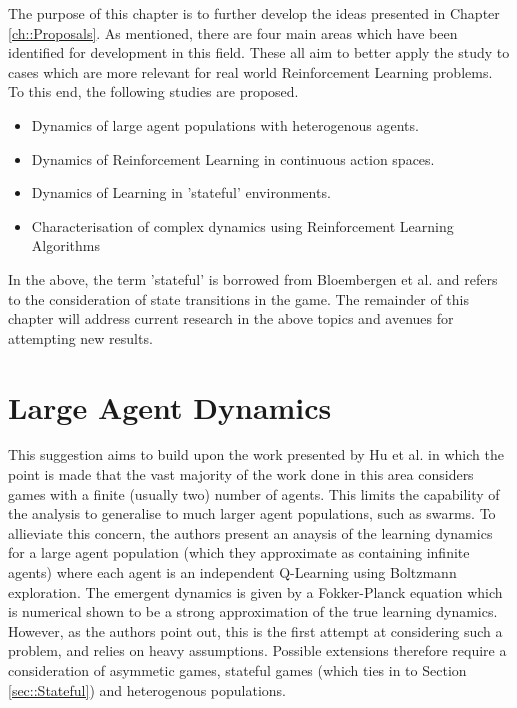 \documentclass[../sample.tex]{subfiles}
\begin{document}
    The purpose of this chapter is to further develop the ideas presented in Chapter
    \ref{ch::Proposals}. As mentioned, there are four main areas which have been identified for
    development in this field. These all aim to better apply the study to cases which are more
    relevant for real world Reinforcement Learning problems. To this end, the following studies are
    proposed.
    
    \begin{itemize}
        \item Dynamics of large agent populations with heterogenous agents.
        \item Dynamics of Reinforcement Learning in continuous action spaces.
        \item Dynamics of Learning in 'stateful' environments.
        \item Characterisation of complex dynamics using Reinforcement Learning Algorithms
    \end{itemize}

    In the above, the term 'stateful' is borrowed from Bloembergen et al. \cite{Bloembergen2015} and
   refers to the consideration of state transitions in the game. The remainder of this chapter will
   address current research in the above topics and avenues for attempting new results.
   
   \section{Large Agent Dynamics}

    This suggestion aims to build upon the work presented by Hu et al. \cite{Hu2019} in which the
    point is made that the vast majority of the work done in this area considers games with a finite
    (usually two) number of agents. This limits the capability of the analysis to generalise to much
    larger agent populations, such as swarms. To allieviate this concern, the authors present an
    anaysis of the learning dynamics for a large agent population (which they approximate as
    containing infinite agents) where each agent is an independent Q-Learning using Boltzmann
    exploration. The emergent dynamics is given by a Fokker-Planck equation which is numerical shown
    to be a strong approximation of the true learning dynamics. However, as the authors point out,
    this is the first attempt at considering such a problem, and relies on heavy assumptions.
    Possible extensions therefore require a consideration of asymmetic games, stateful games (which
    ties in to Section \ref{sec::Stateful}) and heterogenous populations.
\end{document}
